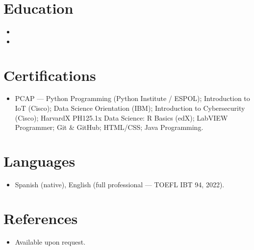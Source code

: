 \documentclass[11pt,a4paper,sans]{moderncv}
\begin{document}

\section{Education}
\vspace{1pt}
\begin{itemize}

\item{}

\vspace{3pt}

\item{}

\end{itemize}


\section{Certifications}
\vspace{1pt}
\begin{itemize}
\item PCAP --- Python Programming (Python Institute / ESPOL); Introduction to IoT (Cisco); Data Science Orientation (IBM); Introduction to Cybersecurity (Cisco); HarvardX PH125.1x Data Science: R Basics (edX); LabVIEW Programmer; Git \& GitHub; HTML/CSS; Java Programming.
\end{itemize}


\section{Languages}
\vspace{1pt}
\begin{itemize}
\item Spanish (native), English (full professional --- TOEFL IBT 94, 2022).
\end{itemize}


\section{References}
\vspace{1pt}
\begin{itemize}
\item{Available upon request.}
\end{itemize}
\end{document}
